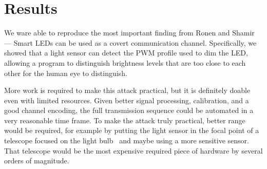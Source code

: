 \section{Results} %
\label{sec:results}

We ware able to reproduce the most important finding from Ronen and Shamir~\cite{Ronen:2016:EFAIDCSL} --- Smart LEDs can be used as a covert communication channel.
Specifically, we showed that a light sensor can detect the PWM profile used to dim the LED, allowing a program to distinguish brightness levels that are too close to each other for the human eye to distinguish.

More work is required to make this attack practical, but it is definitely doable even with limited resources.
Given better signal processing, calibration, and a good channel encoding, the full transmission sequence could be automated in a very reasonable time frame.
To make the attack truly practical, better range would be required, for example by putting the light sensor in the focal point of a telescope focused on the light bulb~\cite{Ronen:2016:EFAIDCSL} and maybe using a more sensitive sensor.
That telescope would be the most expensive required piece of hardware by several orders of magnitude.
